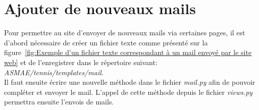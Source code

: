 \section{Ajouter de nouveaux mails}

Pour permettre au site d'envoyer de nouveaux mails via certaines pages, il est d'abord nécessaire de créer un fichier texte comme présenté sur la figure~\ref{fig:Exemple d'un fichier texte correspondant à un mail envoyé par le site web} et de l'enregistrer dans le répertoire suivant: \textit{ASMAE/tennis/templates/mail}.\\

Il faut ensuite écrire une nouvelle méthode dans le fichier \textit{mail.py} afin de pouvoir compléter et envoyer le mail. L'appel de cette méthode depuis le fichier \textit{views.py} permettra ensuite l'envois de mails.
